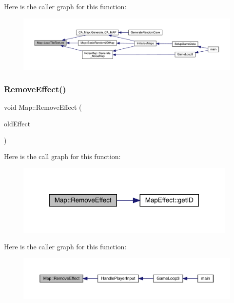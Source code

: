 Here is the caller graph for this function\+:
\nopagebreak
\begin{figure}[H]
\begin{center}
\leavevmode
\includegraphics[width=350pt]{class_map_ab64e7930cd811d847dbbee056b1e2fb0_icgraph}
\end{center}
\end{figure}
\mbox{\label{class_map_a0165980338b5bb5739a05dee4d4b341b}} 
\subsubsection{\texorpdfstring{Remove\+Effect()}{RemoveEffect()}}
{\footnotesize\ttfamily void Map\+::\+Remove\+Effect (\begin{DoxyParamCaption}\item[{\mbox{\hyperlink{class_map_effect}{Map\+Effect}}}]{old\+Effect }\end{DoxyParamCaption})}

Here is the call graph for this function\+:
\nopagebreak
\begin{figure}[H]
\begin{center}
\leavevmode
\includegraphics[width=310pt]{class_map_a0165980338b5bb5739a05dee4d4b341b_cgraph}
\end{center}
\end{figure}
Here is the caller graph for this function\+:
\nopagebreak
\begin{figure}[H]
\begin{center}
\leavevmode
\includegraphics[width=350pt]{class_map_a0165980338b5bb5739a05dee4d4b341b_icgraph}
\end{center}
\end{figure}
\mbox{\label{class_map_a2b24578b19c64fd8bc94ab2f36ffb9fc}} 
